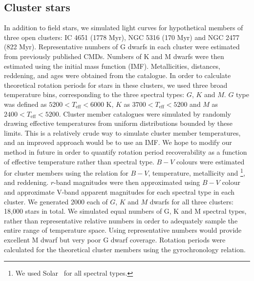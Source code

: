 \subsection{Cluster stars}
In addition to field stars, we simulated light curves for hypothetical members
of three open clusters: IC 4651 (1778 Myr), NGC 5316 (170 Myr) and NGC 2477
(822 Myr).
Representative numbers of G dwarfs in each cluster were estimated from
previously published CMDs.
Numbers of K and M dwarfs were then estimated using the \citet{Kroupa2001}
initial mass function (IMF).
Metallicities, distances, reddening, and ages were obtained from the
\citet{Kharchenko2013} catalogue.
In order to calculate theoretical rotation periods for stars in these
clusters, we used three broad temperature bins, corresponding to the three
spectral types: $G$, $K$ and $M$.
$G$ type was defined as $5200 < T_{\mathrm{eff}} < 6000$ K, $K$ as $3700 <
T_{\mathrm{eff}} < 5200$ and $M$ as $2400 < T_{\mathrm{eff}} < 5200$.
Cluster member catalogues were simulated by randomly drawing effective
temperatures from uniform distributions bounded by these limits.
This is a relatively crude way to simulate cluster member temperatures, and an
improved approach would be to use an IMF.
We hope to modify our method in future in order to quantify rotation period
recoverability as a function of effective temperature rather than spectral
type.
$B-V$ colours were estimated for cluster members using the
\citet{Sekiguchi2000} relation for $B-V$, temperature, metallicity and
\logg\footnote{We used Solar \logg\ for all spectral types.}, and reddening.
$r$-band magnitudes were then approximated using $B-V$ colour and approximate
V-band apparent magnitudes for each spectral type in each cluster.
We generated 2000 each of $G$, $K$ and $M$ dwarfs for all three clusters:
18,000 stars in total.
We simulated equal numbers of G, K and M spectral types, rather than
representative relative numbers in order to adequately sample the entire
range of temperature space.
Using representative numbers would provide excellent M dwarf but very poor G
dwarf coverage.
Rotation periods were calculated for the theoretical cluster members using the
\citet{Angus2015} gyrochronology relation.


